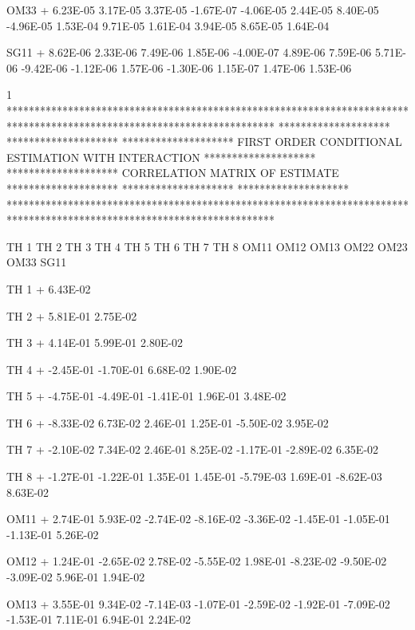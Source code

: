 \documentclass[
  letterpaper,
  toc=chapterentrywithdots,
  listof=totoc,
  11pt,
  headings=small,
  usegeometry]{scrreprt}
\begin{document}
\begin{nonmemlisting}
 OM33
+        6.23E-05  3.17E-05  3.37E-05 -1.67E-07 -4.06E-05  2.44E-05  8.40E-05 -4.96E-05  1.53E-04  9.71E-05  1.61E-04  3.94E-05
          8.65E-05  1.64E-04
 
 SG11
+        8.62E-06  2.33E-06  7.49E-06  1.85E-06 -4.00E-07  4.89E-06  7.59E-06  5.71E-06 -9.42E-06 -1.12E-06  1.57E-06 -1.30E-06
          1.15E-07  1.47E-06  1.53E-06
 
1
 ************************************************************************************************************************
 ********************                                                                                ********************
 ********************               FIRST ORDER CONDITIONAL ESTIMATION WITH INTERACTION              ********************
 ********************                          CORRELATION MATRIX OF ESTIMATE                        ********************
 ********************                                                                                ********************
 ************************************************************************************************************************
 

            TH 1      TH 2      TH 3      TH 4      TH 5      TH 6      TH 7      TH 8      OM11      OM12      OM13      OM22  
             OM23      OM33      SG11  
 
 TH 1
+        6.43E-02
 
 TH 2
+        5.81E-01  2.75E-02
 
 TH 3
+        4.14E-01  5.99E-01  2.80E-02
 
 TH 4
+       -2.45E-01 -1.70E-01  6.68E-02  1.90E-02
 
 TH 5
+       -4.75E-01 -4.49E-01 -1.41E-01  1.96E-01  3.48E-02
 
 TH 6
+       -8.33E-02  6.73E-02  2.46E-01  1.25E-01 -5.50E-02  3.95E-02
 
 TH 7
+       -2.10E-02  7.34E-02  2.46E-01  8.25E-02 -1.17E-01 -2.89E-02  6.35E-02
 
 TH 8
+       -1.27E-01 -1.22E-01  1.35E-01  1.45E-01 -5.79E-03  1.69E-01 -8.62E-03  8.63E-02
 
 OM11
+        2.74E-01  5.93E-02 -2.74E-02 -8.16E-02 -3.36E-02 -1.45E-01 -1.05E-01 -1.13E-01  5.26E-02
 
 OM12
+        1.24E-01 -2.65E-02  2.78E-02 -5.55E-02  1.98E-01 -8.23E-02 -9.50E-02 -3.09E-02  5.96E-01  1.94E-02
 
 OM13
+        3.55E-01  9.34E-02 -7.14E-03 -1.07E-01 -2.59E-02 -1.92E-01 -7.09E-02 -1.53E-01  7.11E-01  6.94E-01  2.24E-02
 

\end{nonmemlisting}
\end{document}
